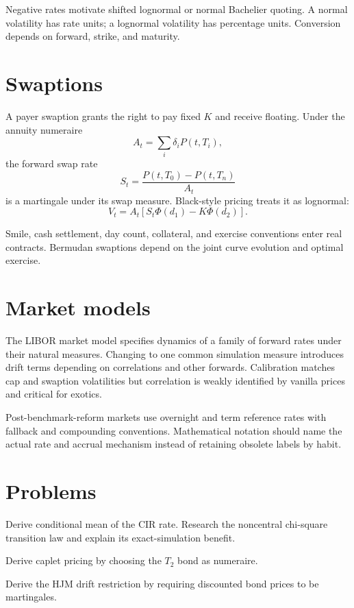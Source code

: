 Negative rates motivate shifted lognormal or normal Bachelier quoting. A normal
volatility has rate units; a lognormal volatility has percentage units. Conversion
depends on forward, strike, and maturity.

\section{Swaptions}

A payer swaption grants the right to pay fixed $K$ and receive floating. Under the
annuity numeraire
\[
A_t=\sum_i\delta_iP(t,T_i),
\]
the forward swap rate
\[
S_t=\frac{P(t,T_0)-P(t,T_n)}{A_t}
\]
is a martingale under its swap measure. Black-style pricing treats it as lognormal:
\[
V_t=A_t[S_t\Phi(d_1)-K\Phi(d_2)].
\]

Smile, cash settlement, day count, collateral, and exercise conventions enter real
contracts. Bermudan swaptions depend on the joint curve evolution and optimal
exercise.

\section{Market models}

The LIBOR market model specifies dynamics of a family of forward rates under their
natural measures. Changing to one common simulation measure introduces drift terms
depending on correlations and other forwards. Calibration matches cap and swaption
volatilities but correlation is weakly identified by vanilla prices and critical for
exotics.

Post-benchmark-reform markets use overnight and term reference rates with fallback
and compounding conventions. Mathematical notation should name the actual rate and
accrual mechanism instead of retaining obsolete labels by habit.

\section{Problems}

\begin{exercise}
Derive conditional mean of the CIR rate. Research the noncentral chi-square transition
law and explain its exact-simulation benefit.
\end{exercise}
\begin{exercise}
Derive caplet pricing by choosing the $T_2$ bond as numeraire.
\end{exercise}
\begin{exercise}
Derive the HJM drift restriction by requiring discounted bond prices to be
martingales.
\end{exercise}


